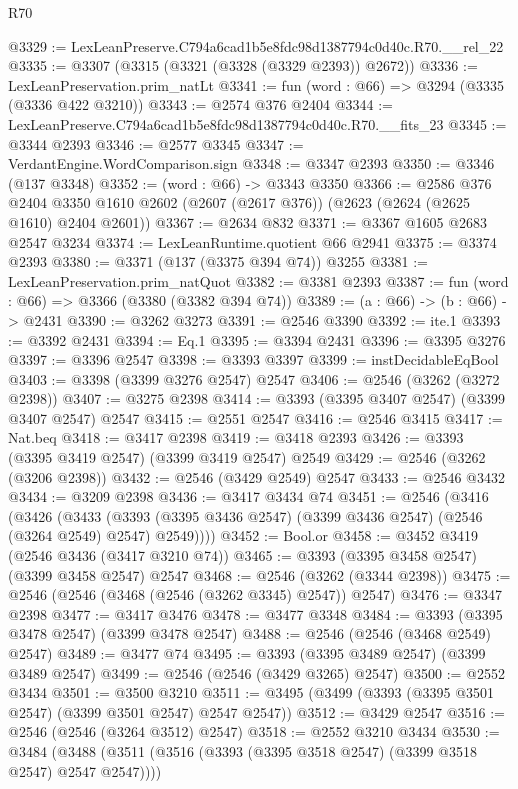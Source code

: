 \begin{lexlean}{R70}
\begin{coremodule}
@3329 := LexLeanPreserve.C794a6cad1b5e8fdc98d1387794c0d40c.R70.__rel_22
@3335 := @3307 (@3315 (@3321 (@3328 (@3329 @2393)) @2672))
@3336 := LexLeanPreservation.prim_natLt
@3341 := fun (word : @66) => @3294 (@3335 (@3336 @422 @3210))
@3343 := @2574 @376 @2404
@3344 := LexLeanPreserve.C794a6cad1b5e8fdc98d1387794c0d40c.R70.__fits_23
@3345 := @3344 @2393
@3346 := @2577 @3345
@3347 := VerdantEngine.WordComparison.sign
@3348 := @3347 @2393
@3350 := @3346 (@137 @3348)
@3352 := (word : @66) -> @3343 @3350
@3366 := @2586
    @376
    @2404
    @3350
    @1610
    @2602
    (@2607 (@2617 @376))
    (@2623 (@2624 (@2625 @1610) @2404 @2601))
@3367 := @2634 @832
@3371 := @3367 @1605 @2683 @2547 @3234
@3374 := LexLeanRuntime.quotient @66 @2941
@3375 := @3374 @2393
@3380 := @3371 (@137 (@3375 @394 @74)) @3255
@3381 := LexLeanPreservation.prim_natQuot
@3382 := @3381 @2393
@3387 := fun (word : @66) => @3366 (@3380 (@3382 @394 @74))
@3389 := (a : @66) -> (b : @66) -> @2431
@3390 := @3262 @3273
@3391 := @2546 @3390
@3392 := ite.{1}
@3393 := @3392 @2431
@3394 := Eq.{1}
@3395 := @3394 @2431
@3396 := @3395 @3276
@3397 := @3396 @2547
@3398 := @3393 @3397
@3399 := instDecidableEqBool
@3403 := @3398 (@3399 @3276 @2547) @2547
@3406 := @2546 (@3262 (@3272 @2398))
@3407 := @3275 @2398
@3414 := @3393 (@3395 @3407 @2547) (@3399 @3407 @2547) @2547
@3415 := @2551 @2547
@3416 := @2546 @3415
@3417 := Nat.beq
@3418 := @3417 @2398
@3419 := @3418 @2393
@3426 := @3393 (@3395 @3419 @2547) (@3399 @3419 @2547) @2549
@3429 := @2546 (@3262 (@3206 @2398))
@3432 := @2546 (@3429 @2549) @2547
@3433 := @2546 @3432
@3434 := @3209 @2398
@3436 := @3417 @3434 @74
@3451 := @2546
    (@3416
      (@3426
        (@3433 (@3393 (@3395 @3436 @2547) (@3399 @3436 @2547) (@2546 (@3264 @2549) @2547) @2549))))
@3452 := Bool.or
@3458 := @3452 @3419 (@2546 @3436 (@3417 @3210 @74))
@3465 := @3393 (@3395 @3458 @2547) (@3399 @3458 @2547) @2547
@3468 := @2546 (@3262 (@3344 @2398))
@3475 := @2546 (@2546 (@3468 (@2546 (@3262 @3345) @2547)) @2547)
@3476 := @3347 @2398
@3477 := @3417 @3476
@3478 := @3477 @3348
@3484 := @3393 (@3395 @3478 @2547) (@3399 @3478 @2547)
@3488 := @2546 (@2546 (@3468 @2549) @2547)
@3489 := @3477 @74
@3495 := @3393 (@3395 @3489 @2547) (@3399 @3489 @2547)
@3499 := @2546 (@2546 (@3429 @3265) @2547)
@3500 := @2552 @3434
@3501 := @3500 @3210
@3511 := @3495 (@3499 (@3393 (@3395 @3501 @2547) (@3399 @3501 @2547) @2547 @2547))
@3512 := @3429 @2547
@3516 := @2546 (@2546 (@3264 @3512) @2547)
@3518 := @2552 @3210 @3434
@3530 := @3484 (@3488 (@3511 (@3516 (@3393 (@3395 @3518 @2547) (@3399 @3518 @2547) @2547 @2547))))

\end{coremodule}
\end{lexlean}
